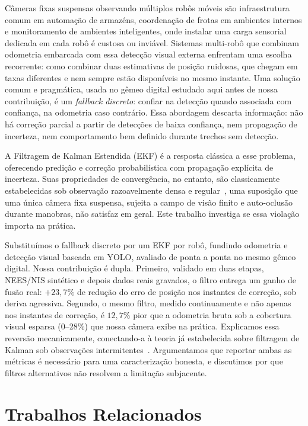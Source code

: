 \documentclass[runningheads]{llncs}
\begin{document}
Câmeras fixas suspensas observando múltiplos robôs móveis são
infraestrutura comum em automação de armazéns, coordenação de frotas
em ambientes internos e monitoramento de ambientes inteligentes, onde
instalar uma carga sensorial dedicada em cada robô é custosa ou
inviável. Sistemas multi-robô que combinam odometria embarcada com
essa detecção visual externa enfrentam uma escolha recorrente: como
combinar duas estimativas de posição ruidosas, que chegam em taxas
diferentes e nem sempre estão disponíveis no mesmo instante. Uma
solução comum e pragmática, usada no gêmeo digital estudado aqui antes
de nossa contribuição, é um \emph{fallback discreto}: confiar na
detecção quando associada com confiança, na odometria caso contrário.
Essa abordagem descarta informação: não há correção parcial a partir
de detecções de baixa confiança, nem propagação de incerteza, nem
comportamento bem definido durante trechos sem detecção.

A Filtragem de Kalman Estendida (EKF) é a resposta clássica a esse
problema, oferecendo predição e correção probabilística com
propagação explícita de incerteza. Suas propriedades de convergência,
no entanto, são classicamente estabelecidas sob observação
razoavelmente densa e regular~\cite{dissanayake2001slam}, uma
suposição que uma única câmera fixa suspensa, sujeita a campo de
visão finito e auto-oclusão durante manobras, não satisfaz em geral.
Este trabalho investiga se essa violação importa na prática.

Substituímos o fallback discreto por um EKF por robô, fundindo
odometria e detecção visual baseada em YOLO, avaliado de ponta a ponta
no mesmo gêmeo digital. Nossa contribuição é dupla. Primeiro,
validado em duas etapas, NEES/NIS sintético e depois dados reais
gravados, o filtro entrega um ganho de fusão real: $+23,7\%$ de
redução do erro de posição nos instantes de correção, sob deriva
agressiva. Segundo, o mesmo filtro, medido continuamente e não apenas
nos instantes de correção, é $12,7\%$ pior que a odometria bruta sob
a cobertura visual esparsa (0--28\%) que nossa câmera exibe na
prática. Explicamos essa reversão mecanicamente, conectando-a à
teoria já estabelecida sobre filtragem de Kalman sob observações
intermitentes~\cite{sinopoli2004intermittent,censi2009geometric}.
Argumentamos que reportar ambas as métricas é necessário para uma
caracterização honesta, e discutimos por que filtros alternativos não
resolvem a limitação subjacente.

\section{Trabalhos Relacionados}
\label{sec:related-work}
\end{document}

